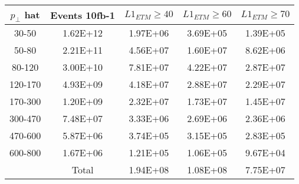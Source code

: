 \begin{tabular}{|c|c|c|c|c|}
\hline
$p_\perp$ hat  & Events 10fb-1 & $L1_{ETM}\geq40$ & $L1_{ETM}\geq60$ & $L1_{ETM}\geq70$ \\
\hline\hline
  30-50 & \num{1.62E+12} & \num{1.97E+06} & \num{3.69E+05} & \num{1.39E+05} \\ 
  50-80 & \num{2.21E+11} & \num{4.56E+07} & \num{1.60E+07} & \num{8.62E+06} \\ 
 80-120 & \num{3.00E+10} & \num{7.81E+07} & \num{4.22E+07} & \num{2.87E+07} \\ 
120-170 & \num{4.93E+09} & \num{4.18E+07} & \num{2.88E+07} & \num{2.29E+07} \\ 
170-300 & \num{1.20E+09} & \num{2.32E+07} & \num{1.73E+07} & \num{1.45E+07} \\ 
300-470 & \num{7.48E+07} & \num{3.33E+06} & \num{2.69E+06} & \num{2.36E+06} \\ 
470-600 & \num{5.87E+06} & \num{3.74E+05} & \num{3.15E+05} & \num{2.83E+05} \\ 
600-800 & \num{1.67E+06} & \num{1.21E+05} & \num{1.06E+05} & \num{9.67E+04} \\ 
\hline \hline
 & Total & \num{1.94E+08} & \num{1.08E+08} & \num{7.75E+07} \\ 
\hline
\end{tabular}







